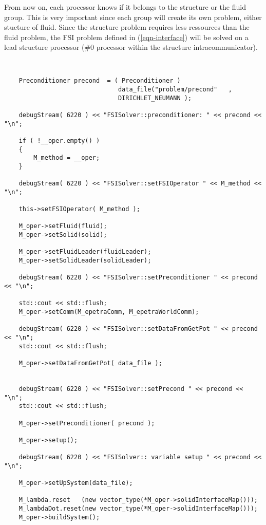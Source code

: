 From now on, each processor knows if it belongs to the structure or the fluid group. This is
very important since each group will create its own problem, either stucture of fluid.
Since the structure problem requires less ressources than the fluid problem, the FSI problem defined in (\ref{eqn-interface})
will be solved on a lead structure processor (\#0 processor within the structure intracommunicator).

\begin{verbatim}


    Preconditioner precond  = ( Preconditioner )
                               data_file("problem/precond"   ,
                               DIRICHLET_NEUMANN );

    debugStream( 6220 ) << "FSISolver::preconditioner: " << precond << "\n";

    if ( !__oper.empty() )
    {
        M_method = __oper;
    }

    debugStream( 6220 ) << "FSISolver::setFSIOperator " << M_method << "\n";

    this->setFSIOperator( M_method );

    M_oper->setFluid(fluid);
    M_oper->setSolid(solid);

    M_oper->setFluidLeader(fluidLeader);
    M_oper->setSolidLeader(solidLeader);

    debugStream( 6220 ) << "FSISolver::setPreconditioner " << precond << "\n";

    std::cout << std::flush;
    M_oper->setComm(M_epetraComm, M_epetraWorldComm);

    debugStream( 6220 ) << "FSISolver::setDataFromGetPot " << precond << "\n";
    std::cout << std::flush;

    M_oper->setDataFromGetPot( data_file );


    debugStream( 6220 ) << "FSISolver::setPrecond " << precond << "\n";
    std::cout << std::flush;

    M_oper->setPreconditioner( precond );

    M_oper->setup();

    debugStream( 6220 ) << "FSISolver:: variable setup " << precond << "\n";

    M_oper->setUpSystem(data_file);

    M_lambda.reset   (new vector_type(*M_oper->solidInterfaceMap()));
    M_lambdaDot.reset(new vector_type(*M_oper->solidInterfaceMap()));
    M_oper->buildSystem();

\end{verbatim}

